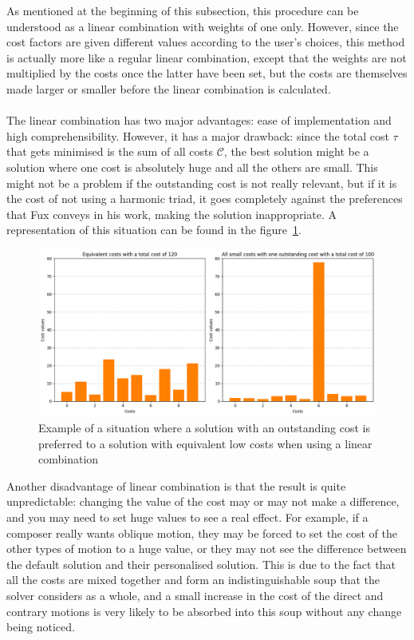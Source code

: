 As mentioned at the beginning of this subsection, this procedure can be understood as a linear combination with weights of one only. However, since the cost factors are given different values according to the user's choices, this method is actually more like a regular linear combination, except that the weights are not multiplied by the costs once the latter have been set, but the costs are themselves made larger or smaller before the linear combination is calculated.

\paragraph{}
The linear combination has two major advantages: ease of implementation and high comprehensibility.
However, it has a major drawback: since the total cost $\tau$ that gets minimised is the sum of all costs $\mathcal{C}$, the best solution might be a solution where one cost is absolutely huge and all the others are small. This might not be a problem if the outstanding cost is not really relevant, but if it is the cost of not using a harmonic triad, it goes completely against the preferences that Fux conveys in his work, making the solution inappropriate. A representation of this situation can be found in the figure~\ref{fig:outstanding-cost}.

\begin{figure}[h!]
    \centering
    \includegraphics[width=1\textwidth]{Images/outstanding-costs.png}
    \caption{Example of a situation where a solution with an outstanding cost is preferred to a solution with equivalent low costs when using a linear combination}
    \label{fig:outstanding-cost}
\end{figure}

Another disadvantage of linear combination is that the result is quite unpredictable: changing the value of the cost may or may not make a difference, and you may need to set huge values to see a real effect. For example, if a composer really wants oblique motion, they may be forced to set the cost of the other types of motion to a huge value, or they may not see the difference between the default solution and their personalised solution. This is due to the fact that all the costs are mixed together and form an indistinguishable soup that the solver considers as a whole, and a small increase in the cost of the direct and contrary motions is very likely to be absorbed into this soup without any change being noticed.

